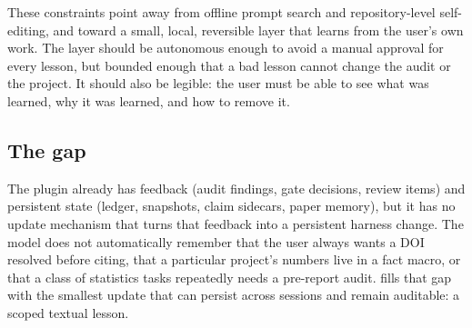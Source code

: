 These constraints point away from offline prompt search and repository-level self-editing, and toward a small, local, reversible layer that learns from the user's own work. The layer should be autonomous enough to avoid a manual approval for every lesson, but bounded enough that a bad lesson cannot change the audit or the project. It should also be legible: the user must be able to see what was learned, why it was learned, and how to remove it.

\subsection{The gap}
The plugin already has feedback (audit findings, gate decisions, review items) and persistent state (ledger, snapshots, claim sidecars, paper memory), but it has no update mechanism that turns that feedback into a persistent harness change. The model does not automatically remember that the user always wants a DOI resolved before citing, that a particular project's numbers live in a fact macro, or that a class of statistics tasks repeatedly needs a pre-report audit. \system{} fills that gap with the smallest update that can persist across sessions and remain auditable: a scoped textual lesson.
